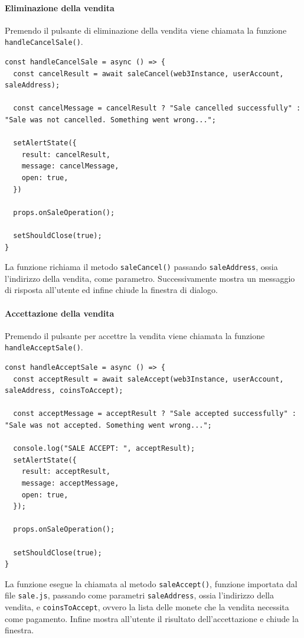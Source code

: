 \documentclass[a4paper]{article}
\begin{document}
        \paragraph{Eliminazione della vendita}
        Premendo il pulsante di eliminazione della vendita viene chiamata la funzione \verb|handleCancelSale()|.
\begin{lstlisting}[style=ES6, title={Funzione handleCancelSale()}]
const handleCancelSale = async () => {
  const cancelResult = await saleCancel(web3Instance, userAccount, saleAddress);

  const cancelMessage = cancelResult ? "Sale cancelled successfully" : "Sale was not cancelled. Something went wrong...";

  setAlertState({
    result: cancelResult,
    message: cancelMessage,
    open: true,
  })

  props.onSaleOperation();

  setShouldClose(true);
}\end{lstlisting}
        La funzione richiama il metodo \verb|saleCancel()| passando \verb|saleAddress|, ossia l'indirizzo della vendita, come parametro. Successivamente mostra un messaggio di risposta all'utente ed infine chiude la finestra di dialogo.
        \paragraph{Accettazione della vendita}
        Premendo il pulsante per accettre la vendita viene chiamata la funzione \verb|handleAcceptSale()|.
\begin{lstlisting}[style=ES6, title={Funzione handleAcceptSale()}]
const handleAcceptSale = async () => {
  const acceptResult = await saleAccept(web3Instance, userAccount, saleAddress, coinsToAccept);

  const acceptMessage = acceptResult ? "Sale accepted successfully" : "Sale was not accepted. Something went wrong...";

  console.log("SALE ACCEPT: ", acceptResult);
  setAlertState({
    result: acceptResult,
    message: acceptMessage,
    open: true,
  });

  props.onSaleOperation();

  setShouldClose(true);
}\end{lstlisting}
        La funzione esegue la chiamata al metodo \verb|saleAccept()|, funzione importata dal file \verb|sale.js|, passando come parametri \verb|saleAddress|, ossia l'indirizzo della vendita, e \verb|coinsToAccept|, ovvero la lista delle monete che la vendita necessita come pagamento.
        Infine mostra all'utente il risultato dell'accettazione e chiude la finestra.
\end{document}
